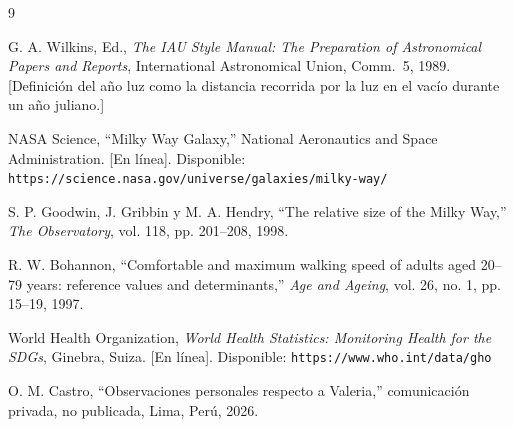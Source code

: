 \documentclass[conference]{IEEEtran}
\begin{document}
\begin{thebibliography}{9}

G. A. Wilkins, Ed., \emph{The IAU Style Manual: The Preparation of
Astronomical Papers and Reports}, International Astronomical Union,
Comm.~5, 1989. [Definición del año luz como la distancia recorrida por la luz
en el vacío durante un año juliano.]

NASA Science, ``Milky Way Galaxy,'' National Aeronautics and Space
Administration. [En línea]. Disponible:
\texttt{https://science.nasa.gov/universe/galaxies/milky-way/}

S. P. Goodwin, J. Gribbin y M. A. Hendry, ``The relative size of the Milky
Way,'' \emph{The Observatory}, vol. 118, pp. 201--208, 1998.

R. W. Bohannon, ``Comfortable and maximum walking speed of adults aged
20--79 years: reference values and determinants,'' \emph{Age and Ageing},
vol. 26, no. 1, pp. 15--19, 1997.

World Health Organization, \emph{World Health Statistics: Monitoring Health
for the SDGs}, Ginebra, Suiza. [En línea]. Disponible:
\texttt{https://www.who.int/data/gho}

O. M. Castro, ``Observaciones personales respecto a Valeria,''
comunicación privada, no publicada, Lima, Perú, 2026.

\end{thebibliography}
\end{document}
